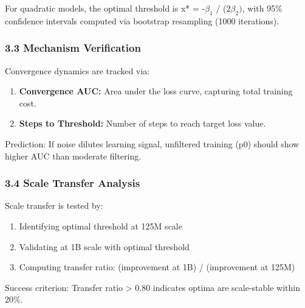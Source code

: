 For quadratic models, the optimal threshold is x* = -$\beta _1$ / ($2\beta _{2})$, with 95\% confidence intervals computed via bootstrap resampling (1000 iterations).

\subsubsection{3.3 Mechanism Verification}

Convergence dynamics are tracked via:

\begin{enumerate}
\item \textbf{Convergence AUC:} Area under the loss curve, capturing total training cost.
\item \textbf{Steps to Threshold:} Number of steps to reach target loss value.
\end{enumerate}

Prediction: If noise dilutes learning signal, unfiltered training (p0) should show higher AUC than moderate filtering.

\subsubsection{3.4 Scale Transfer Analysis}

Scale transfer is tested by:
\begin{enumerate}
\item Identifying optimal threshold at 125M scale
\item Validating at 1B scale with optimal threshold
\item Computing transfer ratio: (improvement at 1B) / (improvement at 125M)
\end{enumerate}

Success criterion: Transfer ratio > 0.80 indicates optima are scale-stable within 20\%.
